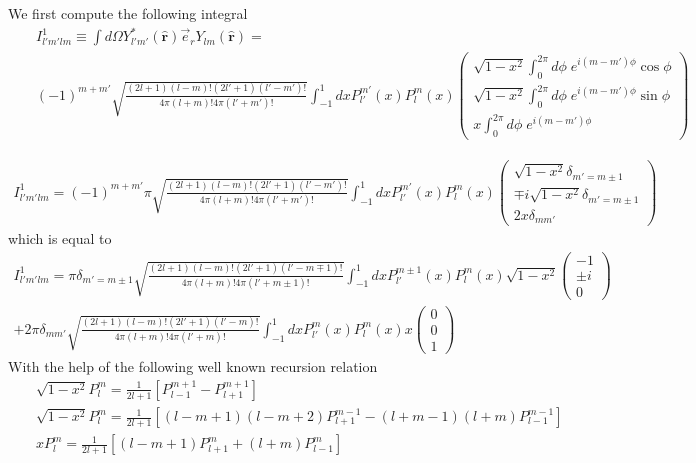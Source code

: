 \documentclass[aps,prb,floatfix,epsfig,singlecolumn,showpacs,preprintnumbers]{revtex4}
\renewcommand{\vr}{{\mathbf{r}}}
\begin{document}
We first compute the following integral
\begin{eqnarray}
&&I^1_{l'm'lm}\equiv\int d\Omega Y^*_{l'm'}(\hat{\vr}) \vec{e}_r Y_{lm}(\hat{\vr})=\\
&&(-1)^{m+m'}
\sqrt{\frac{(2l+1)(l-m)!(2l'+1)(l'-m')!}{4\pi(l+m)! 4\pi (l'+m')!}}
\int_{-1}^1 dx 
 P_{l'}^{m'}(x) P_l^m(x) 
\left(
\begin{array}{c}
\sqrt{1-x^2} \int_0^{2\pi} d\phi\;  e^{i(m-m')\phi}\cos\phi \\
\sqrt{1-x^2} \int_0^{2\pi} d\phi\;  e^{i(m-m')\phi}\sin\phi\\
x \int_0^{2\pi} d\phi\;  e^{i(m-m')\phi}
\end{array}
\right)
\end{eqnarray}

\begin{eqnarray}
I^1_{l'm'lm}=(-1)^{m+m'}\pi
\sqrt{\frac{(2l+1)(l-m)!(2l'+1)(l'-m')!}{4\pi(l+m)! 4\pi (l'+m')!}}
\int_{-1}^1 dx 
 P_{l'}^{m'}(x) P_l^m(x) 
 \left(
\begin{array}{c}
\sqrt{1-x^2} \delta_{m'=m\pm 1}\\
\mp i \sqrt{1-x^2}  \delta_{m'=m\pm 1}\\
2 x \delta_{mm'}
\end{array}
\right)
\end{eqnarray}
which is equal to 
\begin{eqnarray}
I^1_{l'm'lm}=
\pi \delta_{m'=m\pm 1}
\sqrt{\frac{(2l+1)(l-m)!(2l'+1)(l'-m\mp 1)!}{4\pi(l+m)! 4\pi (l'+m\pm 1)!}}
\int_{-1}^1 dx 
 P_{l'}^{m\pm 1}(x) P_l^m(x) 
\sqrt{1-x^2} 
 \left(
\begin{array}{c}
-1 \\
\pm i
\\
0\end{array}
\right)
\nonumber\\
+
2\pi \delta_{mm'}
\sqrt{\frac{(2l+1)(l-m)!(2l'+1)(l'-m)!}{4\pi(l+m)! 4\pi (l'+m)!}}
\int_{-1}^1 dx 
 P_{l'}^{m}(x) P_l^m(x) x 
 \left(
\begin{array}{c}
0\\
0\\
1
\end{array}
\right)
\end{eqnarray}
With the help of the following well known recursion relation
\begin{eqnarray}
&& \sqrt{1-x^2}P_l^m = \frac{1}{2l+1}\left[P_{l-1}^{m+1}-P_{l+1}^{m+1}\right]
\\
&& \sqrt{1-x^2}P_l^m = \frac{1}{2l+1}
\left[(l-m+1)(l-m+2)P_{l+1}^{m-1}-(l+m-1)(l+m)P_{l-1}^{m-1}\right]
\\
&& x P_l^m = \frac{1}{2l+1} \left[
(l-m+1)P_{l+1}^m+(l+m)P_{l-1}^m
\right]
\end{eqnarray}
\end{document}
